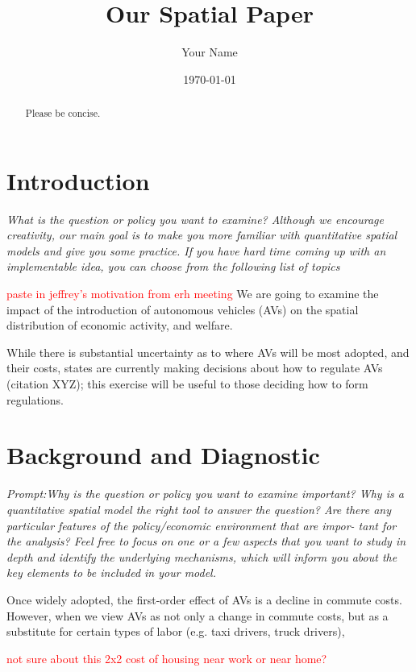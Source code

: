 \documentclass{article}
\title{Our Spatial Paper}
\author{Your Name}
\date{\today}
\begin{document}
\maketitle

\begin{abstract}
    Please be concise.
\end{abstract}





\section{Introduction}
\textit{What is the question or policy you want to examine? Although we encourage
creativity, our main goal is to make you more familiar with quantitative spatial models
and give you some practice. If you have hard time coming up with an implementable
idea, you can choose from the following list of topics}


\textcolor{red}{paste in jeffrey's motivation from erh meeting}
We are going to examine the impact of the introduction of autonomous vehicles (AVs) on the spatial distribution of economic activity, and welfare.

While there is substantial uncertainty as to where AVs will be most adopted, and their costs, states are currently making decisions about how to regulate AVs (citation XYZ); this exercise will be useful to those deciding how to form regulations.




\section{Background and Diagnostic}
\textit{Prompt:Why is the question or policy you want to examine
important? Why is a quantitative spatial model the right tool to answer the question?
Are there any particular features of the policy/economic environment that are impor-
tant for the analysis? Feel free to focus on one or a few aspects that you want to study
in depth and identify the underlying mechanisms, which will inform you about the key
elements to be included in your model.}



Once widely adopted, the first-order effect of AVs is a decline in commute costs. However, when we view AVs as not only a change in commute costs, but as a substitute for certain types of labor (e.g. taxi drivers, truck drivers),
 
\textcolor{red}{not sure about this 2x2 cost of housing near work or near home?}
\end{document}
